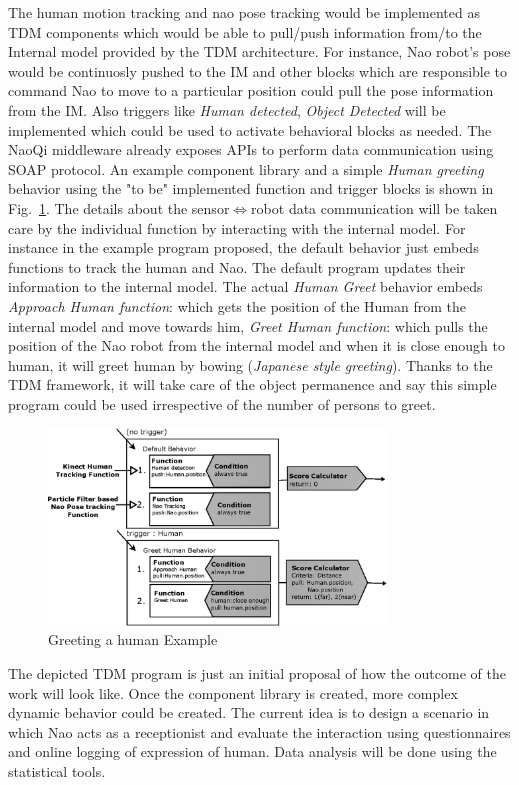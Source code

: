 The human motion tracking and nao pose tracking would be implemented as TDM components which would be able to pull/push information from/to the Internal model provided by the TDM architecture. For instance, Nao robot's pose would be continuosly pushed to the IM and other blocks which are responsible to command Nao to move to a particular position could pull the pose information from the IM. Also triggers like \emph{Human detected}, \emph{Object Detected} will be implemented which could be used to activate behavioral blocks as needed. The NaoQi middleware already exposes APIs to perform data communication using SOAP protocol. An example component library and a simple \emph{Human greeting} behavior using the "to be" implemented function and trigger blocks is shown in Fig.~\ref{fig:program}. The details about the sensor$\Leftrightarrow$robot data communication will be taken care by the individual function by interacting with the internal model. For instance in the example program proposed, the default behavior just embeds functions to track the human and Nao. The default program updates their information to the internal model. The actual \emph{Human Greet} behavior embeds \emph{Approach Human function}: which gets the position of the Human from the internal model and move towards him, \emph{Greet Human function}: which pulls the position of the Nao robot from the internal model and when it is close enough to human, it will greet human by bowing (\emph{Japanese style greeting}). Thanks to the TDM framework, it will take care of the object permanence and say this simple program could be used irrespective of the number of persons to greet.
\begin{figure}
\centering
\includegraphics[width=0.8\textwidth]{assets/tdm_example_proposed.eps}
\caption{Greeting a human Example}
\label{fig:program}
\end{figure}	
	The depicted TDM program is just an initial proposal of how the outcome of the work will look like. Once the component library is created, more complex dynamic behavior could be created. The current idea is to design a scenario in which Nao acts as a receptionist and evaluate the interaction using questionnaires and online logging of expression of human. Data analysis will be done using the statistical tools.

